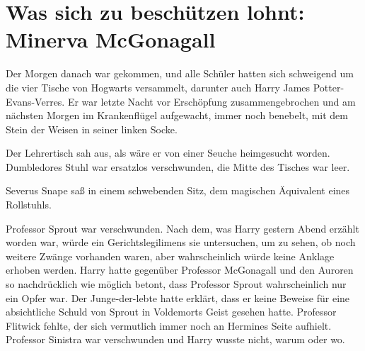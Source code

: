 \chapter{Was sich zu beschützen lohnt: Minerva McGonagall}

Der Morgen danach war gekommen, und alle Schüler hatten sich schweigend um die vier Tische von Hogwarts versammelt, darunter auch Harry James Potter-Evans-Verres. Er war letzte Nacht vor Erschöpfung zusammengebrochen und am nächsten Morgen im Krankenflügel aufgewacht, immer noch benebelt, mit dem Stein der Weisen in seiner linken Socke.

Der Lehrertisch sah aus, als wäre er von einer Seuche heimgesucht worden.
Dumbledores Stuhl war ersatzlos verschwunden, die Mitte des Tisches war leer.

Severus Snape saß in einem schwebenden Sitz, dem magischen Äquivalent eines Rollstuhls.

Professor Sprout war verschwunden. Nach dem, was Harry gestern Abend erzählt worden war, würde ein Gerichtslegilimens sie untersuchen, um zu sehen, ob noch weitere Zwänge vorhanden waren, aber wahrscheinlich würde keine Anklage erhoben werden. Harry hatte gegenüber Professor McGonagall und den Auroren so nachdrücklich wie möglich betont, dass Professor Sprout wahrscheinlich nur ein Opfer war. Der Junge-der-lebte hatte erklärt, dass er keine Beweise für eine absichtliche Schuld von Sprout in Voldemorts Geist gesehen hatte.
Professor Flitwick fehlte, der sich vermutlich immer noch an Hermines Seite aufhielt.
Professor Sinistra war verschwunden und Harry wusste nicht, warum oder wo.

